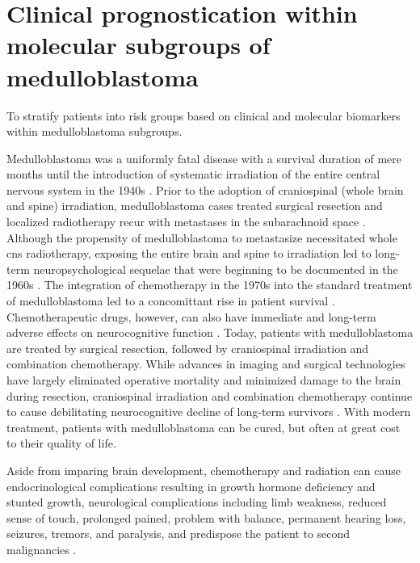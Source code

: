 \chapter{Clinical prognostication within molecular subgroups of medulloblastoma}
\label{ch:clin-prog}

\begin{objective}
To stratify patients into risk groups based on clinical and molecular biomarkers within medulloblastoma subgroups.
\end{objective}

Medulloblastoma was a uniformly fatal disease with a survival duration of mere months until the introduction of systematic irradiation of the entire central nervous system in the 1940s . Prior to the adoption of craniospinal (whole brain and spine) irradiation, medulloblastoma cases treated surgical resection and localized radiotherapy recur with metastases in the subarachnoid space . Although the propensity of medulloblastoma to metastasize necessitated whole \gls{cns} radiotherapy, exposing the entire brain and spine to irradiation led to long-term neuropsychological sequelae that were beginning to be documented in the 1960s . The integration of chemotherapy in the 1970s into the standard treatment of medulloblastoma led to a concomittant rise in patient survival . Chemotherapeutic drugs, however, can also have immediate and long-term adverse effects on neurocognitive function . Today, patients with medulloblastoma are treated by surgical resection, followed by craniospinal irradiation and combination chemotherapy. While advances in imaging and surgical technologies have largely eliminated operative mortality and minimized damage to the brain during resection, craniospinal irradiation and combination chemotherapy continue to cause debilitating neurocognitive decline of long-term survivors . With modern treatment, patients with medulloblastoma can be cured, but often at great cost to their quality of life.

Aside from imparing brain development, chemotherapy and radiation can cause endocrinological complications resulting in growth hormone deficiency and stunted growth, neurological complications including limb weakness, reduced sense of touch, prolonged pained, problem with balance, permanent hearing loss, seizures, tremors, and paralysis, and predispose the patient to second malignancies .

